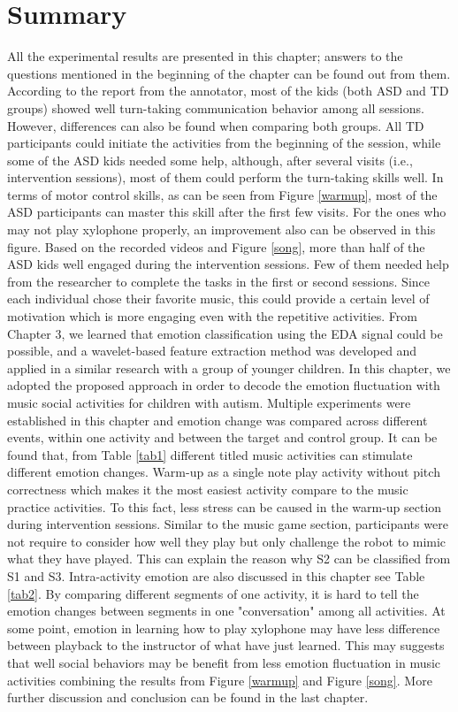 \section{Summary}
All the experimental results are presented in this chapter; answers to the questions mentioned in the beginning of the chapter can be found out from them. According to the report from the annotator, most of the kids (both ASD and TD groups) showed
well turn-taking communication behavior among all sessions. However, differences can also be found
when comparing both groups. All TD participants could initiate the activities from the beginning of the
session, while some of the ASD kids needed some help, although, after several visits (i.e., intervention
sessions), most of them could perform the turn-taking skills well. In terms of motor 
control skills, as can be seen from Figure \ref{warmup}, most of the ASD participants
can master this skill after the first few visits. For the ones who may not play xylophone properly, an improvement
also can be observed in this figure. Based on the recorded videos and Figure \ref{song}, 
more than half of the ASD kids well engaged during the intervention sessions. 
Few of them needed help from the researcher to complete the tasks in the first
or second sessions. Since each individual chose their favorite music, this could provide a certain level of motivation which is more engaging even with the repetitive activities. 
From Chapter 3, we learned that emotion classification using the EDA signal could be possible, and a wavelet-based feature extraction method was developed and applied in a similar research with a group of younger children. In this chapter, we adopted the proposed approach in order to decode the emotion fluctuation with music social activities for children with autism.
Multiple experiments were established in this chapter and emotion change was compared across different
events, within one activity and between the target and control group. 
It can be found that, from Table \ref{tab1} different titled music activities can stimulate different emotion changes.
Warm-up as a single note play activity without pitch correctness which makes it the most easiest
activity compare to the music practice activities. To this fact, less stress can be caused in the 
warm-up section during intervention sessions. Similar to the music game section, participants were not
require to consider how well they play but only challenge the robot to mimic what they have played. 
This can explain the reason why S2 can be classified from S1 and S3. Intra-activity emotion are also
discussed in this chapter see Table \ref{tab2}. By comparing different segments of one activity, it is hard to tell the emotion
changes between segments in one "conversation" among all activities. At some point, emotion in learning 
how to play xylophone may have less difference between playback to the instructor of what have just learned.
This may suggests that well social behaviors may be benefit from less emotion fluctuation in music activities
combining the results from Figure \ref{warmup} and Figure \ref{song}. More further discussion and conclusion 
can be found in the last chapter.
